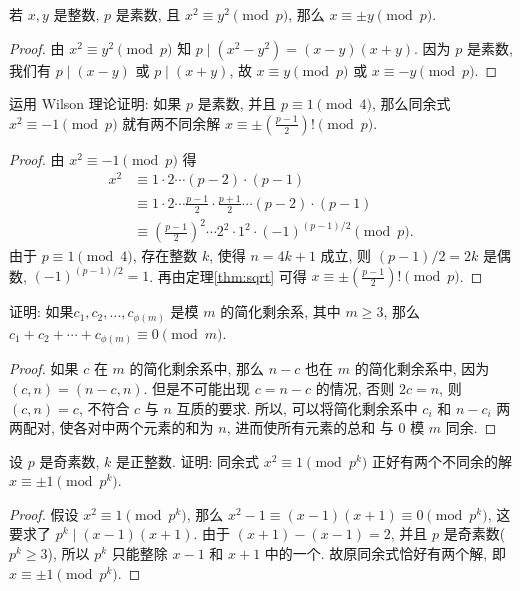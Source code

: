 \documentclass[a5paper,fleqn,10pt]{article}
\begin{document}
\begin{thm}\label{thm:sqrt}
	若 $x,y$ 是整数, $p$ 是素数, 且 $x^2\equiv y^2\pmod p$, 那么 $x\equiv\pm y\pmod p$.
\end{thm}
\begin{proof}
	由 $x^2\equiv y^2\pmod p$ 知 $p\mid(x^2-y^2)=(x-y)(x+y)$. 因为 $p$ 是素数, 我们有 $p\mid(x-y)$ 或 $p\mid(x+y)$,
	故 $x\equiv y\pmod p$ 或 $x\equiv -y\pmod p$.
\end{proof}

\begin{exmp}
	运用 Wilson 理论证明: 如果 $p$ 是素数, 并且 $p\equiv 1\pmod 4$, 那么同余式 $x^2\equiv -1\pmod p$ 就有两不同余解
	$x\equiv\pm\left(\frac{p-1}{2}\right)!\pmod p$.
\end{exmp}
\begin{proof}
	由 $x^2\equiv -1\pmod p$ 得
	\begin{align*}
		x^2 & \equiv 1\cdot 2\cdots(p-2)\cdot(p-1)                                              \\
		    & \equiv 1\cdot 2\cdots\frac{p-1}{2}\cdot\frac{p+1}{2}\cdots(p-2)\cdot(p-1)         \\
		    & \equiv \left(\frac{p-1}{2}\right)^2\cdots 2^2\cdot 1^2\cdot(-1)^{(p-1)/2}\pmod p.
	\end{align*}
	由于 $p\equiv 1\pmod 4$, 存在整数 $k$, 使得 $n=4k+1$ 成立, 则 $(p-1)/2=2k$ 是偶数, $(-1)^{(p-1)/2}=1$.
	再由定理\ref{thm:sqrt} 可得 $x\equiv\pm\left(\frac{p-1}{2}\right)!\pmod p$.
\end{proof}

\begin{exmp}
	证明: 如果$c_1,c_2,\ldots,c_{\phi(m)}$ 是模 $m$ 的简化剩余系, 其中 $m\geq 3$, 那么 $c_1+c_2+\cdots+c_{\phi(m)}\equiv 0\pmod m$.
\end{exmp}
\begin{proof}
	如果 $c$ 在 $m$ 的简化剩余系中, 那么 $n-c$ 也在 $m$ 的简化剩余系中, 因为 $(c,n)=(n-c,n)$.
	但是不可能出现 $c=n-c$ 的情况, 否则 $2c=n$, 则 $(c,n)=c$, 不符合 $c$ 与 $n$ 互质的要求. 所以,
	可以将简化剩余系中 $c_i$ 和 $n-c_i$ 两两配对, 使各对中两个元素的和为 $n$, 进而使所有元素的总和
	与 $0$ 模 $m$ 同余.
\end{proof}

\begin{exmp}
	设 $p$ 是奇素数, $k$ 是正整数. 证明: 同余式 $x^2\equiv 1\pmod{p^k}$ 正好有两个不同余的解 $x\equiv\pm 1\pmod{p^k}$.
\end{exmp}
\begin{proof}
	假设 $x^2\equiv 1\pmod{p^k}$, 那么 $x^2-1\equiv(x-1)(x+1)\equiv 0\pmod{p^k}$, 这要求了 $p^k\mid(x-1)(x+1)$.
	由于 $(x+1)-(x-1)=2$, 并且 $p$ 是奇素数($p^k\geq 3$), 所以 $p^k$ 只能整除 $x-1$ 和 $x+1$ 中的一个.
	故原同余式恰好有两个解, 即 $x\equiv\pm 1\pmod{p^k}$.
\end{proof}
\end{document}
